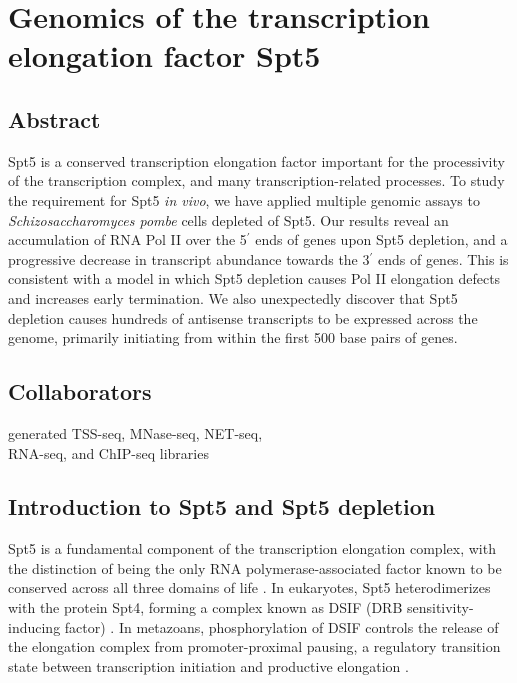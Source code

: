 \chapter{Genomics of the transcription elongation factor Spt5}
\label{chapter:five}

\section{Abstract}

Spt5 is a conserved transcription elongation factor important for the processivity of the transcription complex, and many transcription-related processes.
To study the requirement for Spt5 \textit{in vivo}, we have applied multiple genomic assays to \textit{Schizosaccharomyces pombe} cells depleted of Spt5.
Our results reveal an accumulation of RNA Pol II over the 5$^\prime$ ends of genes upon Spt5 depletion, and a progressive decrease in transcript abundance towards the 3$^\prime$ ends of genes.
This is consistent with a model in which Spt5 depletion causes Pol II elongation defects and increases early termination.
We also unexpectedly discover that Spt5 depletion causes hundreds of antisense transcripts to be expressed across the genome, primarily initiating from within the first 500 base pairs of genes.

\section{Collaborators}

\begin{description}[align=right, leftmargin=!, labelwidth=5cm, noitemsep]
    \item [Ameet Shetty] generated TSS-seq, MNase-seq, NET-seq,\\RNA-seq, and ChIP-seq libraries
\end{description}

\section{Introduction to Spt5 and Spt5 depletion}

Spt5 is a fundamental component of the transcription elongation complex, with the distinction of being the only RNA polymerase-associated factor known to be conserved across all three domains of life \citep{hartzog2013, werner2012}.
In eukaryotes, Spt5 heterodimerizes with the protein Spt4, forming a complex known as DSIF (DRB sensitivity-inducing factor) \citep{hartzog1998,hirtreiter2010,schwer2009,wada1998}.
In metazoans, phosphorylation of DSIF controls the release of the elongation complex from promoter-proximal pausing, a regulatory transition state between transcription initiation and productive elongation \citep{adelman2012}.

